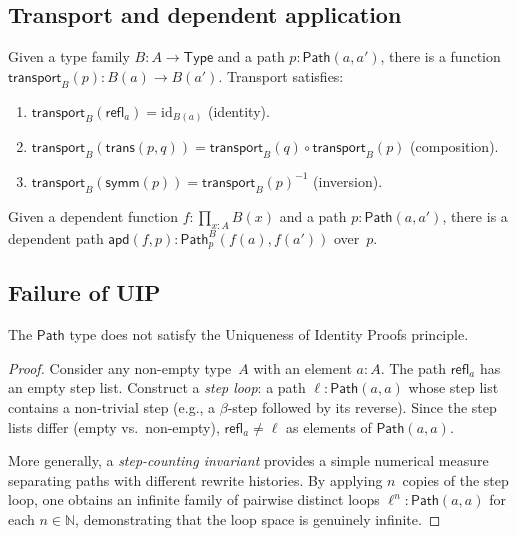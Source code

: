 \documentclass[manuscript]{BSLstyle}
\newcommand{\Path}{\mathsf{Path}}
\newcommand{\refl}{\mathsf{refl}}
\newcommand{\symm}{\mathsf{symm}}
\newcommand{\trans}{\mathsf{trans}}
\newcommand{\transport}{\mathsf{transport}}
\newcommand{\apd}{\mathsf{apd}}
\newcommand{\Type}{\mathsf{Type}}
\newcommand{\Nat}{\mathbb{N}}
\begin{document}
\subsection{Transport and dependent application}

\begin{corollary}[Transport]\label{cor:transport}
Given a type family $B : A \to \Type$ and a path $p : \Path(a, a')$,
there is a function $\transport_B(p) : B(a) \to B(a')$.
Transport satisfies:
\begin{enumerate}
\item $\transport_B(\refl_a) = \mathrm{id}_{B(a)}$ (identity).
\item $\transport_B(\trans(p, q)) = \transport_B(q) \circ \transport_B(p)$ (composition).
\item $\transport_B(\symm(p)) = \transport_B(p)^{-1}$ (inversion).
\end{enumerate}
\end{corollary}

\begin{corollary}\label{cor:apd}
Given a dependent function $f : \prod_{x:A} B(x)$ and a path
$p : \Path(a, a')$, there is a dependent path
$\apd(f, p) : \Path^B_p(f(a), f(a'))$ over~$p$.
\end{corollary}

\subsection{Failure of UIP}\label{ssec:uip-failure}

\begin{theorem}\label{thm:non-uip}
The $\Path$ type does not satisfy the Uniqueness of Identity Proofs
principle.
\end{theorem}

\begin{proof}
Consider any non-empty type~$A$ with an element $a : A$.  The path
$\refl_a$ has an empty step list.  Construct a \emph{step loop}:
a path $\ell : \Path(a, a)$ whose step list contains a non-trivial step
(e.g., a $\beta$-step followed by its reverse).  Since the step lists
differ (empty vs.\ non-empty), $\refl_a \neq \ell$ as elements of
$\Path(a, a)$.

More generally, a \emph{step-counting invariant} provides a simple
numerical measure separating paths with different rewrite histories.
By applying $n$~copies of the step loop, one obtains an infinite family
of pairwise distinct loops $\ell^n : \Path(a, a)$ for each $n \in \Nat$,
demonstrating that the loop space is genuinely infinite.
\end{proof}
\end{document}
